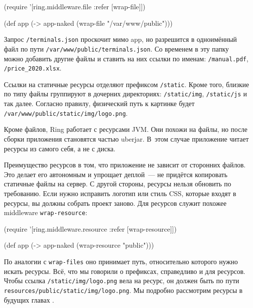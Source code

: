 \begin{english}
  \begin{clojure}
(require '[ring.middleware.file :refer [wrap-file]])

(def app (-> app-naked
             (wrap-file "/var/www/public")))
  \end{clojure}
\end{english}

Запрос \verb|/terminals.json| проскочит мимо app, но разрешится в
одноимённый файл по пути \verb|/var/www/public/terminals.json|. Со
временем в эту папку можно добавить другие файлы и ставить на них ссылки по
именам: \verb|/manual.pdf|, \verb|/price_2020.xlsx|.

Ссылки на статичные ресурсы отделяют префиксом \verb|/static|. Кроме того,
близкие по типу файлы группируют в дочерних директориях: \verb|/static/img|,
\verb|/static/js| и так далее. Согласно правилу, физический путь к картинке
будет \verb|/var/www/public/static/img/logo.png|.

Кроме файлов, Ring работает с ресурсами JVM. Они похожи на файлы, но после
сборки приложения становятся частью uberjar. В~этом случае приложение читает
ресурсы из самого себя, а не с диска.

Преимущество ресурсов в том, что приложение не зависит от сторонних файлов. Это
делает его автономным и упрощает деплой~--- не придётся копировать статичные
файлы на сервер. С другой стороны, ресурсы нельзя обновить по требованию. Если
нужно исправить логотип или стиль CSS, которые входят в ресурсы, вы должны
собрать проект заново. Для ресурсов служит похожее middleware
\verb|wrap-resource|:


\begin{english}
  \begin{clojure}
(require '[ring.middleware.resource
           :refer [wrap-resource]])

(def app (-> app-naked
             (wrap-resource "public")))
  \end{clojure}
\end{english}

По аналогии с \verb|wrap-files| оно принимает путь, относительно которого нужно
искать ресурсы. Всё, что мы говорили о префиксах, справедливо и для
ресурсов. Чтобы ссылка \verb|/static/img/logo.png| вела на ресурс, он должен
быть по пути \verb|resources/public/static/img/logo.png|. Мы подробно рассмотрим
ресурсы в будущих главах .

